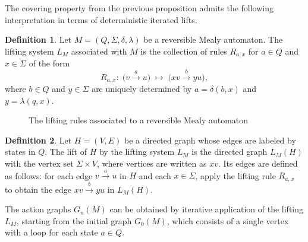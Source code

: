 \documentclass[12pt]{article}
\theoremstyle{definition}
\newtheorem{definition}{Definition}
\begin{document}
The covering property from the previous proposition admits the following interpretation in terms of deterministic iterated lifts.

\begin{definition}
Let $M=(Q,\Sigma,\delta,\lambda)$ be a reversible Mealy automaton.
The lifting system $L_M$ associated with $M$ is the collection of rules $R_{a,x}$ for $a\in Q$ and $x\in\Sigma$ of the form
\[
R_{a,x}:\;
\bigl(v \xrightarrow{a} u\bigr)\;\longmapsto\;
\bigl(xv \xrightarrow{b} yu\bigr),
\]
where $b\in Q$ and $y\in\Sigma$ are uniquely determined by $a=\delta(b,x)$ and $y=\lambda(q,x)$.
\end{definition}



\begin{figure}[t]
\begin{center}
\end{center}
\caption{The lifting rules associated to a reversible Mealy automaton}\label{fig:LiftRuleMealy}
\end{figure}

\begin{definition}
Let $H=(V,E)$ be a directed graph whose edges are labeled by states in $Q$.
The lift of $H$ by the lifting system $L_M$ is the directed graph $L_M(H)$ with the vertex set $\Sigma\times V$, where vertices are written as $xv$. Its edges are defined as follows: for each edge $v \xrightarrow{a} u$ in $H$ and each $x\in \Sigma$, apply the lifting rule $R_{a,x}$ to obtain the edge $xv \xrightarrow{b} yu$ in $L_M(H)$.
\end{definition}

The action graphs $G_n(M)$ can be obtained by iterative application of the lifting $L_M$, starting from the initial graph $G_0(M)$, which consists of a single vertex with a loop for each state $a\in Q$.
\end{document}
